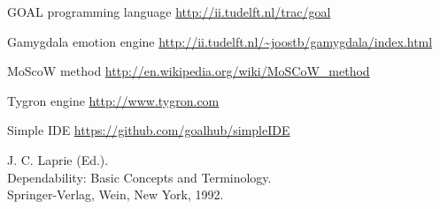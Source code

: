 \documentclass[11pt]{article}
\begin{document}
\clearpage

\printglossaries

\clearpage

\begin{thebibliography}{9}
	
	GOAL programming language
	\url{http://ii.tudelft.nl/trac/goal}
	
	Gamygdala emotion engine
	\url{http://ii.tudelft.nl/~joostb/gamygdala/index.html}
	
	MoScoW method
	\url{http://en.wikipedia.org/wiki/MoSCoW_method }
	
	Tygron engine
	\url{http://www.tygron.com }
	
	Simple IDE
	\url{https://github.com/goalhub/simpleIDE }
	
	J. C. Laprie (Ed.).\\ 
	Dependability: Basic Concepts and Terminology. \\
	Springer-Verlag, Wein, New York, 1992.\\
	
	
\end{thebibliography}
\end{document}
